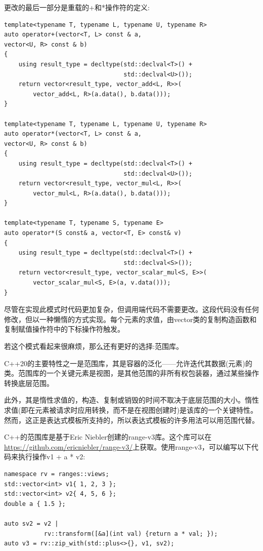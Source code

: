 更改的最后一部分是重载的+和*操作符的定义:

\begin{lstlisting}[style=styleCXX]
template<typename T, typename L, typename U, typename R>
auto operator+(vector<T, L> const & a,
vector<U, R> const & b)
{
	using result_type = decltype(std::declval<T>() +
								 std::declval<U>());
	return vector<result_type, vector_add<L, R>>(
		vector_add<L, R>(a.data(), b.data()));
}

template<typename T, typename L, typename U, typename R>
auto operator*(vector<T, L> const & a,
vector<U, R> const & b)
{
	using result_type = decltype(std::declval<T>() +
								 std::declval<U>());
	return vector<result_type, vector_mul<L, R>>(
		vector_mul<L, R>(a.data(), b.data()));
}

template<typename T, typename S, typename E>
auto operator*(S const& a, vector<T, E> const& v)
{
	using result_type = decltype(std::declval<T>() +
								 std::declval<S>());
	return vector<result_type, vector_scalar_mul<S, E>>(
		vector_scalar_mul<S, E>(a, v.data()));
}
\end{lstlisting}

尽管在实现此模式时代码更加复杂，但调用端代码不需要更改。这段代码没有任何修改，但以一种懒惰的方式实现。每个元素的求值，由vector类的复制构造函数和复制赋值操作符中的下标操作符触发。

若这个模式看起来很麻烦，那么还有更好的选择:范围库。


C++20的主要特性之一是范围库，其是容器的泛化——允许迭代其数据(元素)的类。范围库的一个关键元素是视图，是其他范围的非所有权包装器，通过某些操作转换底层范围。

此外，其是惰性求值的，构造、复制或销毁的时间不取决于底层范围的大小。惰性求值(即在元素被请求时应用转换，而不是在视图创建时)是该库的一个关键特性。然而，这正是表达式模板所支持的，所以表达式模板的许多用法可以用范围代替。

C++的范围库是基于Eric Niebler创建的range-v3库。这个库可以在\url{https://github.com/ericniebler/range-v3/}上获取。使用range-v3，可以编写以下代码来执行操作v1 + a * v2:

\begin{lstlisting}[style=styleCXX]
namespace rv = ranges::views;
std::vector<int> v1{ 1, 2, 3 };
std::vector<int> v2{ 4, 5, 6 };
double a { 1.5 };

auto sv2 = v2 |
		   rv::transform([&a](int val) {return a * val; });
auto v3 = rv::zip_with(std::plus<>{}, v1, sv2);
\end{lstlisting}

